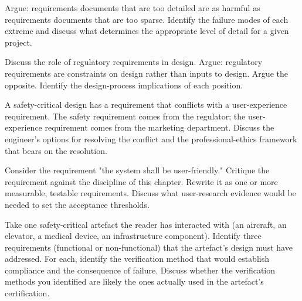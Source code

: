 \begin{exercise}
Argue: requirements documents that are too detailed are as harmful as requirements documents that are too sparse. Identify the failure modes of each extreme and discuss what determines the appropriate level of detail for a given project.
\end{exercise}

\begin{exercise}
Discuss the role of regulatory requirements in design. Argue: regulatory requirements are constraints on design rather than inputs to design. Argue the opposite. Identify the design-process implications of each position.
\end{exercise}

\begin{exercise}
A safety-critical design has a requirement that conflicts with a user-experience requirement. The safety requirement comes from the regulator; the user-experience requirement comes from the marketing department. Discuss the engineer's options for resolving the conflict and the professional-ethics framework that bears on the resolution.
\end{exercise}

\begin{exercise}
Consider the requirement "the system shall be user-friendly." Critique the requirement against the discipline of this chapter. Rewrite it as one or more measurable, testable requirements. Discuss what user-research evidence would be needed to set the acceptance thresholds.
\end{exercise}

\begin{exercise}
Take one safety-critical artefact the reader has interacted with (an aircraft, an elevator, a medical device, an infrastructure component). Identify three requirements (functional or non-functional) that the artefact's design must have addressed. For each, identify the verification method that would establish compliance and the consequence of failure. Discuss whether the verification methods you identified are likely the ones actually used in the artefact's certification.
\end{exercise}
